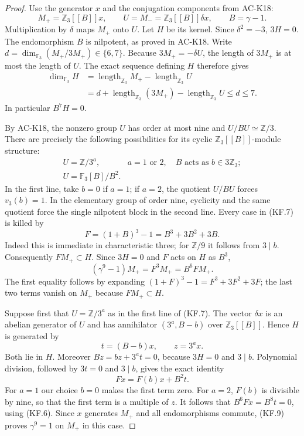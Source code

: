 \begin{proof}
Use the generator $x$ and the conjugation components from
AC-K18:
\[
 M_+=\mathbb Z_3[[B]]x,\qquad
 U=M_-=\mathbb Z_3[[B]]\delta x,
 \qquad B=\gamma-1.
\]
Multiplication by $\delta$ maps $M_+$ onto $U$.
Let $H$ be its kernel.  Since $\delta^2=-3$, $3H=0$.
The endomorphism $B$ is nilpotent, as proved in AC-K18.
Write $d=\dim_{\mathbb F_3}(M_+/3M_+)\in\{6,7\}$.
Because $3M_+=-\delta U$, the length of $3M_+$ is at
most the length of $U$.  The exact sequence defining $H$
therefore gives
\[
 \begin{aligned}
 \dim_{\mathbb F_3}H
 &=\operatorname{length}_{\mathbb Z_3}M_+
        -\operatorname{length}_{\mathbb Z_3}U
 \\
 &=d+\operatorname{length}_{\mathbb Z_3}(3M_+)
        -\operatorname{length}_{\mathbb Z_3}U
 \leq d\leq7.
 \end{aligned}
                                                               \tag{KF.6}
\]
In particular $B^7H=0$.

By AC-K18, the nonzero group $U$ has order at most nine
and $U/BU\simeq\mathbb Z/3$.
There are precisely the following possibilities for its
cyclic $\mathbb Z_3[[B]]$-module structure:
\[
 \begin{array}{ll}
 U=\mathbb Z/3^a,&a=1\text{ or }2,\quad
       B\text{ acts as }b\in3\mathbb Z_3;\\
 U=\mathbb F_3[B]/B^2.&
 \end{array}                                                   \tag{KF.7}
\]
In the first line, take $b=0$ if $a=1$; if $a=2$,
the quotient $U/BU$ forces $v_3(b)=1$.
In the elementary group of order nine, cyclicity and the same
quotient force the single nilpotent block in the second line.
Every case in (KF.7) is killed by
\[
                 F=(1+B)^3-1=B^3+3B^2+3B.           \tag{KF.8}
\]
Indeed this is immediate in characteristic three; for
$\mathbb Z/9$ it follows from $3\mid b$.
Consequently $FM_+\subset H$.
Since $3H=0$ and $F$ acts on $H$ as $B^3$,
\[
       (\gamma^9-1)M_+=F^3M_+=B^6FM_+.             \tag{KF.9}
\]
The first equality follows by expanding
$(1+F)^3-1=F^3+3F^2+3F$; the last two terms vanish on
$M_+$ because $FM_+\subset H$.

Suppose first that $U=\mathbb Z/3^a$ as in the first
line of (KF.7).  The vector $\delta x$ is an abelian
generator of $U$ and has annihilator $(3^a,B-b)$ over
$\mathbb Z_3[[B]]$.  Hence $H$ is generated by
\[
                    t=(B-b)x,\qquad z=3^a x.
\]
Both lie in $H$.  Moreover
$Bz=bz+3^at=0$, because $3H=0$ and $3\mid b$.
Polynomial division, followed by $3t=0$ and $3\mid b$,
gives the exact identity
\[
             Fx=F(b)x+B^2t.                          \tag{KF.10}
\]
For $a=1$ our choice $b=0$ makes the first term zero.
For $a=2$, $F(b)$ is divisible by nine, so that the first
term is a multiple of $z$.
It follows that $B^6Fx=B^8t=0$, using (KF.6).
Since $x$ generates $M_+$ and all endomorphisms commute,
(KF.9) proves $\gamma^9=1$ on $M_+$ in this case.


\end{proof}
